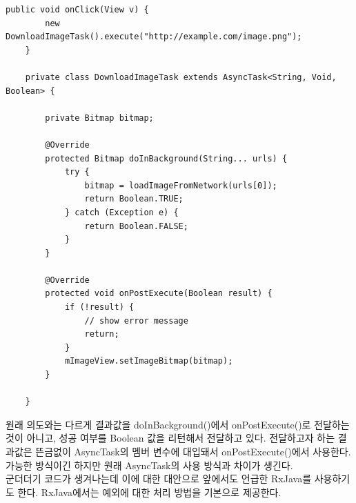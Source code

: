 \begin{lstlisting}[frame=single]
	public void onClick(View v) {
    	new DownloadImageTask().execute("http://example.com/image.png");
	}

	private class DownloadImageTask extends AsyncTask<String, Void, Boolean> {
	
		private Bitmap bitmap;
		
		@Override
    	protected Bitmap doInBackground(String... urls) {
        	try {
        		bitmap = loadImageFromNetwork(urls[0]);
        		return Boolean.TRUE;
        	} catch (Exception e) {
        		return Boolean.FALSE;
        	}
    	}

      	@Override
    	protected void onPostExecute(Boolean result) {
    		if (!result) {
    			// show error message
    			return;
    		}
        	mImageView.setImageBitmap(bitmap);
    	}
    	
	}	
\end{lstlisting}
원래 의도와는 다르게 결과값을 doInBackground()에서 onPostExecute()로 전달하는 것이 아니고, 성공 여부를 Boolean 값을 리턴해서 전달하고 있다. 
전달하고자 하는 결과값은 뜬금없이 AsyncTask의 멤버 변수에 대입돼서 onPostExecute()에서 사용한다.
가능한 방식이긴 하지만 원래 AsyncTask의 사용 방식과 차이가 생긴다.\\

군더더기 코드가 생겨나는데 이에 대한 대안으로 앞에서도 언급한 RxJava를 사용하기도 한다. RxJava에서는 예외에 대한 처리 방법을 기본으로 제공한다.
